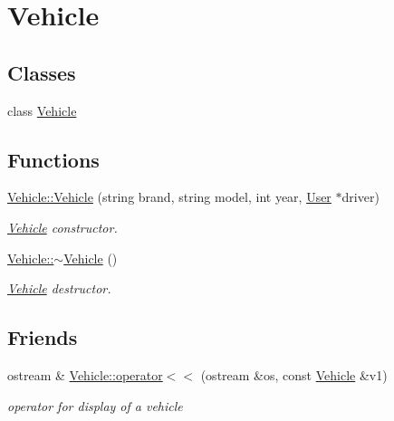 \hypertarget{group___vehicle}{}\section{Vehicle}
\label{group___vehicle}
\subsection*{Classes}
\begin{DoxyCompactItemize}
\item 
class \hyperlink{class_vehicle}{Vehicle}
\end{DoxyCompactItemize}
\subsection*{Functions}
\begin{DoxyCompactItemize}
\item 
\hyperlink{group___vehicle_ga9e9c39065cec28140e97259a324f6d5a}{Vehicle\+::\+Vehicle} (string brand, string model, int year, \hyperlink{class_user}{User} $\ast$driver)
\begin{DoxyCompactList}\small\item\em \hyperlink{class_vehicle}{Vehicle} constructor. \end{DoxyCompactList}\item 
\mbox{\label{group___vehicle_ga61ab140c755b8e0e824d54117cf4546f}} 
\hyperlink{group___vehicle_ga61ab140c755b8e0e824d54117cf4546f}{Vehicle\+::$\sim$\+Vehicle} ()
\begin{DoxyCompactList}\small\item\em \hyperlink{class_vehicle}{Vehicle} destructor. \end{DoxyCompactList}\end{DoxyCompactItemize}
\subsection*{Friends}
\begin{DoxyCompactItemize}
\item 
ostream \& \hyperlink{group___vehicle_ga854e861646772cea9bb6222c5b03b1d4}{Vehicle\+::operator$<$$<$} (ostream \&os, const \hyperlink{class_vehicle}{Vehicle} \&v1)
\begin{DoxyCompactList}\small\item\em operator for display of a vehicle \end{DoxyCompactList}\end{DoxyCompactItemize}

